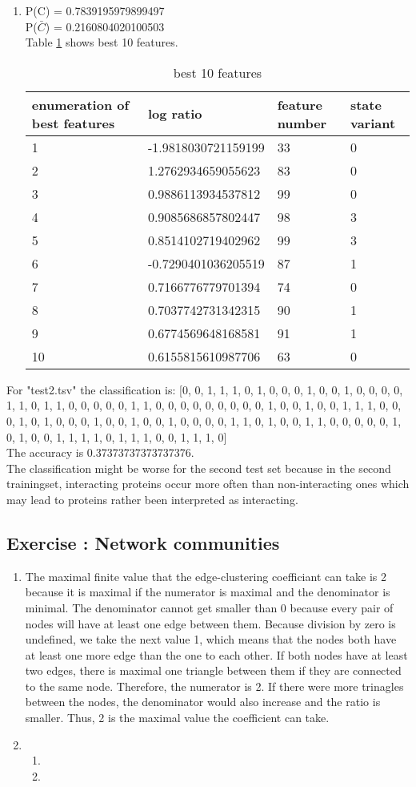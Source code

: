 \documentclass[10pt,a4paper]{article}
\newcommand{\exercise}[1]
{
  \stepcounter{subsection}
  \subsection*{Exercise \thesubsection: #1}

}
\begin{document}
\begin{enumerate}
\item P(C) = 0.7839195979899497\\
P($\bar{C}$) = 0.2160804020100503\\
Table \ref{tab2} shows best 10 features.
\begin{table}[b]
\label{tab2}
\begin{tabular}{llll}
enumeration of best features & log ratio & feature number & state variant\\
\hline
1 & -1.9818030721159199 & 33 & 0\\
2 & 1.2762934659055623 & 83 & 0\\
3 & 0.9886113934537812 & 99 & 0\\
4 & 0.9085686857802447 & 98 & 3\\
5 & 0.8514102719402962 & 99 & 3\\
6 & -0.7290401036205519 & 87 & 1\\
7 & 0.7166776779701394 & 74 & 0\\
8 & 0.7037742731342315 & 90 & 1\\
9 & 0.6774569648168581 & 91 & 1\\
10 & 0.6155815610987706 & 63 & 0\\
\end{tabular}
\caption{best 10 features}
\end{table}
\end{enumerate}
For "test2.tsv" the classification is: [0, 0, 1, 1, 1, 0, 1, 0, 0, 0, 1, 0, 0, 1, 0, 0, 0, 0, 1, 1, 0, 1, 1, 0, 0, 0, 0, 0, 1, 1, 0, 0, 0, 0, 0, 0, 0, 0, 0, 1, 0, 0, 1, 0, 0, 1, 1, 1, 0, 0, 0, 1, 0, 1, 0, 0, 0, 1, 0, 0, 1, 0, 0, 1, 0, 0, 0, 0, 1, 1, 0, 1, 0, 0, 1, 1, 0, 0, 0, 0, 0, 1, 0, 1, 0, 0, 1, 1, 1, 1, 0, 1, 1, 1, 0, 0, 1, 1, 1, 0]\\
The accuracy is 0.37373737373737376.\\
The classification might be worse for the second test set because in the second trainingset, interacting proteins occur more often than non-interacting ones which may lead to proteins rather been interpreted as interacting.

\exercise{Network communities}
\begin{enumerate}
\item The maximal finite value that the edge-clustering coefficiant can take is 2 because it is maximal if the numerator is maximal and the denominator is minimal. The denominator cannot get smaller than 0 because every pair of nodes will have at least one edge between them. Because division by zero is undefined, we take the next value 1, which means that the nodes both have at least one more edge than the one to each other. If both nodes have at least two edges, there is maximal one triangle between them if they are connected to the same node. Therefore, the numerator is 2. If there were more trinagles between the nodes, the denominator would also increase and the ratio is smaller. Thus, 2 is the maximal value the coefficient can take.

\item
\begin{enumerate}
\item
\item
\end{enumerate}
\end{enumerate}
\end{document}
